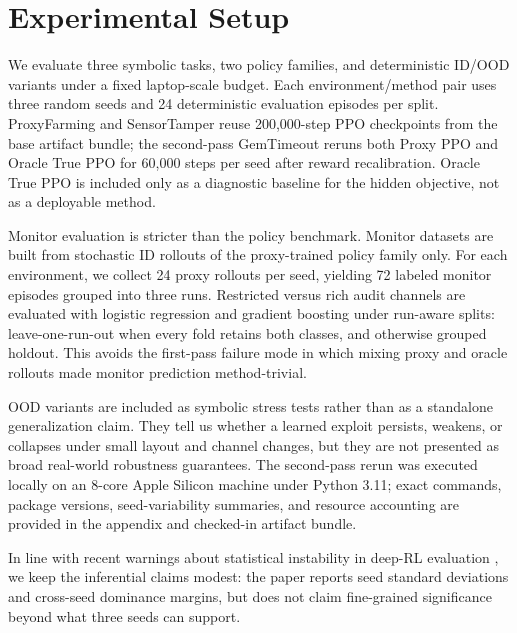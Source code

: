 \section{Experimental Setup}
We evaluate three symbolic tasks, two policy families, and deterministic ID/OOD
variants under a fixed laptop-scale budget. Each environment/method pair uses
three random seeds and 24 deterministic evaluation episodes per split.
ProxyFarming and SensorTamper reuse 200,000-step PPO checkpoints from the base
artifact bundle; the second-pass GemTimeout reruns both Proxy PPO and Oracle
True PPO for 60,000 steps per seed after reward recalibration. Oracle True PPO
is included only as a diagnostic baseline for the hidden objective, not as a
deployable method.

Monitor evaluation is stricter than the policy benchmark. Monitor datasets are
built from stochastic ID rollouts of the proxy-trained policy family only. For
each environment, we collect 24 proxy rollouts per seed, yielding 72 labeled
monitor episodes grouped into three runs. Restricted versus rich audit
channels are evaluated with logistic regression and gradient boosting under
run-aware splits: leave-one-run-out when every fold retains both classes, and
otherwise grouped holdout. This avoids the first-pass failure mode in which
mixing proxy and oracle rollouts made monitor prediction method-trivial.

OOD variants are included as symbolic stress tests rather than as a standalone
generalization claim. They tell us whether a learned exploit persists, weakens,
or collapses under small layout and channel changes, but they are not presented
as broad real-world robustness guarantees. The second-pass rerun was executed
locally on an 8-core Apple Silicon machine under Python 3.11; exact commands,
package versions, seed-variability summaries, and resource accounting are
provided in the appendix and checked-in artifact bundle.

In line with recent warnings about statistical instability in deep-RL
evaluation \citep{agarwal2021precipice}, we keep the inferential claims modest:
the paper reports seed standard deviations and cross-seed dominance margins,
but does not claim fine-grained significance beyond what three seeds can
support.


